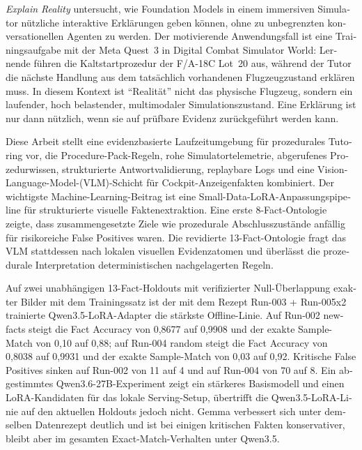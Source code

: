\begin{otherlanguage}{ngerman}
\emph{Explain Reality} untersucht, wie Foundation Models in einem immersiven
Simulator n\"utzliche interaktive Erkl\"arungen geben k\"onnen, ohne zu
unbegrenzten konversationellen Agenten zu werden. Der motivierende
Anwendungsfall ist eine Trainingsaufgabe mit der Meta Quest~3 in Digital Combat
Simulator World: Lernende f\"uhren die Kaltstartprozedur der F/A-18C Lot~20 aus,
w\"ahrend der Tutor die n\"achste Handlung aus dem tats\"achlich vorhandenen
Flugzeugzustand erkl\"aren muss. In diesem Kontext ist ``Realit\"at'' nicht das
physische Flugzeug, sondern ein laufender, hoch belastender, multimodaler
Simulationszustand. Eine Erkl\"arung ist nur dann n\"utzlich, wenn sie auf
pr\"ufbare Evidenz zur\"uckgef\"uhrt werden kann.

Diese Arbeit stellt eine evidenzbasierte Laufzeitumgebung f\"ur prozedurales
Tutoring vor, die Procedure-Pack-Regeln, rohe Simulatortelemetrie, abgerufenes
Prozedurwissen, strukturierte Antwortvalidierung, replaybare Logs und eine
Vision-Language-Model-(VLM)-Schicht f\"ur Cockpit-Anzeigenfakten kombiniert. Der
wichtigste Machine-Learning-Beitrag ist eine Small-Data-LoRA-Anpassungspipeline
f\"ur strukturierte visuelle Faktenextraktion. Eine erste 8-Fact-Ontologie
zeigte, dass zusammengesetzte Ziele wie prozedurale Abschlusszust\"ande
anf\"allig f\"ur risikoreiche False Positives waren. Die revidierte
13-Fact-Ontologie fragt das VLM stattdessen nach lokalen visuellen
Evidenzatomen und \"uberl\"asst die prozedurale Interpretation deterministischen
nachgelagerten Regeln.

Auf zwei unabh\"angigen 13-Fact-Holdouts mit verifizierter Null-\"Uberlappung
exakter Bilder mit dem Trainingssatz ist der mit dem Rezept Run-003 +
Run-005x2 trainierte Qwen3.5-LoRA-Adapter die st\"arkste Offline-Linie. Auf
Run-002 newfacts steigt die Fact Accuracy von 0,8677 auf 0,9908 und der exakte
Sample-Match von 0,10 auf 0,88; auf Run-004 random steigt die Fact Accuracy von
0,8038 auf 0,9931 und der exakte Sample-Match von 0,03 auf 0,92. Kritische False
Positives sinken auf Run-002 von 11 auf 4 und auf Run-004 von 70 auf 8. Ein
abgestimmtes Qwen3.6-27B-Experiment zeigt ein st\"arkeres Basismodell und einen
LoRA-Kandidaten f\"ur das lokale Serving-Setup, \"ubertrifft die
Qwen3.5-LoRA-Linie auf den aktuellen Holdouts jedoch nicht. Gemma verbessert
sich unter demselben Datenrezept deutlich und ist bei einigen kritischen Fakten
konservativer, bleibt aber im gesamten Exact-Match-Verhalten unter Qwen3.5.


\end{otherlanguage}
